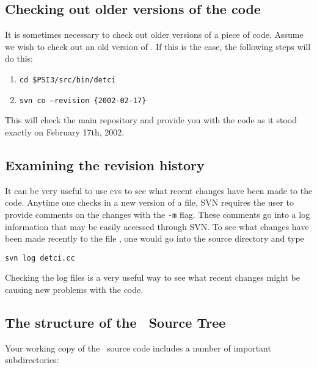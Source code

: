 \subsection{Checking out older versions of the code}
It is sometimes necessary to check out older versions of a piece of code.
Assume we wish to check out an old version of \PSIdetci. If this
is the case, the following steps will do this:
\begin{enumerate}
\item {\tt cd \$PSI3/src/bin/detci}
\item {\tt svn co --revision \{2002-02-17\}}
\end{enumerate}

This will check the main repository and provide you with the code as
it stood exactly on February 17th, 2002. 

\subsection{Examining the revision history}
It can be very useful to use cvs to see what recent changes have been
made to the code.  Anytime one checks in a new version of a file, SVN
requires the user to provide comments on the changes with the {\tt -m}
flag.  These comments go into a log information that may be easily
accessed through SVN.  To see what changes have been made recently to
the file , one would go into the  source
directory and type
\begin{verbatim}
svn log detci.cc
\end{verbatim}
Checking the log files is a very useful way to see what recent changes might 
be causing new problems with the code.

\subsection{The structure of the \PSIthree\ Source Tree}
\label{psitree} 

Your working copy of the \PSIthree\ source code includes a number of
important subdirectories:

